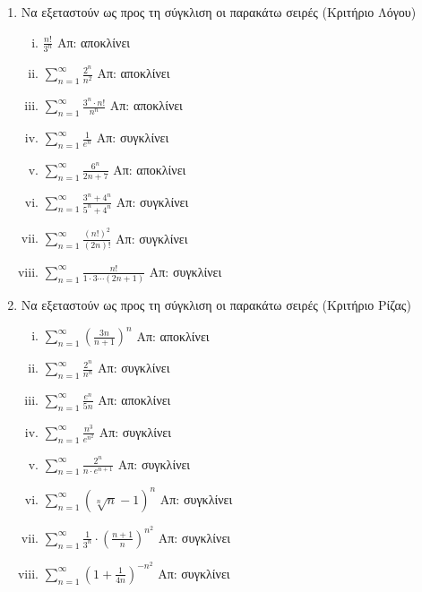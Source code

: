\begin{enumerate}
    \item Να εξεταστούν ως προς τη σύγκλιση οι παρακάτω σειρές (Κριτήριο Λόγου)
        \begin{enumerate}[i)]
            \item $ \frac{n!}{3^{n}} $ \hfill Απ: αποκλίνει 
            \item $ \sum_{n=1}^{\infty} \frac{2^{n}}{n^{2}} $ \hfill Απ: αποκλίνει
            \item $ \sum_{n=1}^{\infty} \frac{3^{n}\cdot n!}{n^{n}} $ \hfill Απ: 
                αποκλίνει
            \item $ \sum_{n=1}^{\infty} \frac{1}{e^{n}} $ \hfill Απ: συγκλίνει 
            \item $ \sum_{n=1}^{\infty} \frac{6^{n}}{2n+7} $ \hfill Απ: αποκλίνει 
            \item $ \sum_{n=1}^{\infty} \frac{3^{n}+4^{n}}{5^{n}+4^{n}} $ \hfill Απ: 
                συγκλίνει
            \item $ \sum_{n=1}^{\infty} \frac{(n!)^{2}}{(2n)!} $ \hfill Απ: συγκλίνει
            \item $ \sum_{n=1}^{\infty} \frac{n!}{1\cdot 3 \cdots (2n+1)} $ \hfill Απ: 
                συγκλίνει

        \end{enumerate}
    \item Να εξεταστούν ως προς τη σύγκλιση οι παρακάτω σειρές (Κριτήριο Ρίζας)

        \begin{enumerate}[i)]
            \item $ \sum_{n=1}^{\infty} \left(\frac{3n}{n+1} \right)^{n} $ 
                \hfill Απ: αποκλίνει 
            \item $ \sum_{n=1}^{\infty} \frac{2^{n}}{n^{n}} $ \hfill Απ: συγκλίνει 
            \item $ \sum_{n=1}^{\infty} \frac{e^{n}}{5n} $ \hfill Απ: αποκλίνει 
            \item $ \sum_{n=1}^{\infty} \frac{n^{3}}{e^{n^{2}}} $ \hfill Απ: συγκλίνει 
            \item $ \sum_{n=1}^{\infty} \frac{2^{n}}{n\cdot e^{n+1}} $ \hfill Απ: 
                συγκλίνει
            \item $ \sum_{n=1}^{\infty} \left(\sqrt[n]{n} -1\right)^{n} $ 
                \hfill Απ: συγκλίνει 
            \item $ \sum_{n=1}^{\infty} \frac{1}{3^{n}} \cdot 
                \left(\frac{n+1}{n} \right)^{n^{2}} $ \hfill Απ: συγκλίνει 
            \item $ \sum_{n=1}^{\infty} \left(1+ \frac{1}{4n} \right)^{-n^{2}} $
                \hfill Απ: συγκλίνει 
        \end{enumerate}


\end{enumerate}
